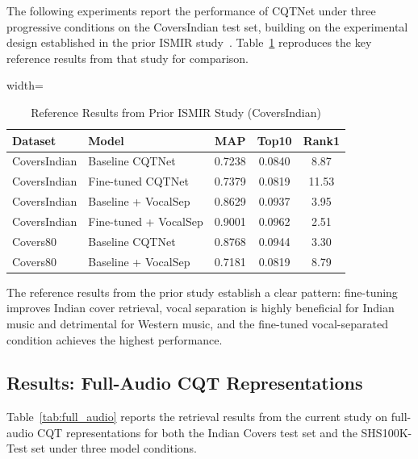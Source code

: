 \documentclass[conference]{IEEEtran}
\begin{document}
The following experiments report the performance of CQTNet under three progressive conditions on the CoversIndian test set, building on the experimental design established in the prior ISMIR study~\cite{ismir_paper}. Table~\ref{tab:ismir_baseline} reproduces the key reference results from that study for comparison.

\begin{table}[htbp]
    \caption{Reference Results from Prior ISMIR Study (CoversIndian)}
    \label{tab:ismir_baseline}
    \centering
    \begin{adjustbox}{width=\columnwidth}
    \begin{tabular}{llccc}
    \toprule
    \textbf{Dataset} & \textbf{Model} & \textbf{MAP} & \textbf{Top10} & \textbf{Rank1} \\
    \midrule
    CoversIndian & Baseline CQTNet & 0.7238 & 0.0840 & 8.87 \\
    CoversIndian & Fine-tuned CQTNet & 0.7379 & 0.0819 & 11.53 \\
    CoversIndian & Baseline + VocalSep & 0.8629 & 0.0937 & 3.95 \\
    CoversIndian & Fine-tuned + VocalSep & 0.9001 & 0.0962 & 2.51 \\
    Covers80     & Baseline CQTNet & 0.8768 & 0.0944 & 3.30 \\
    Covers80     & Baseline + VocalSep & 0.7181 & 0.0819 & 8.79 \\
    \bottomrule
    \end{tabular}
    \end{adjustbox}
\end{table}

The reference results from the prior study establish a clear pattern: fine-tuning improves Indian cover retrieval, vocal separation is highly beneficial for Indian music and detrimental for Western music, and the fine-tuned vocal-separated condition achieves the highest performance.

\subsection{Results: Full-Audio CQT Representations}

Table~\ref{tab:full_audio} reports the retrieval results from the current study on full-audio CQT representations for both the Indian Covers test set and the SHS100K-Test set under three model conditions.
\end{document}

